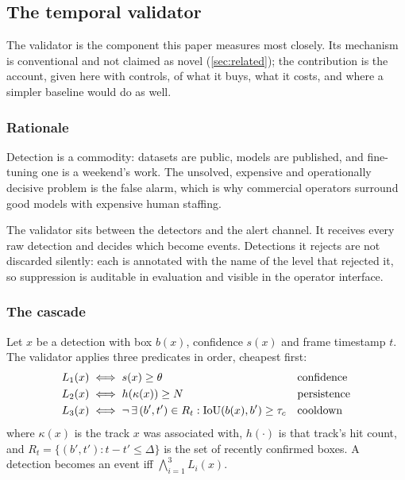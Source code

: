 \subsection{The temporal validator}
\label{sec:validator}

The validator is the component this paper measures most closely. Its
mechanism is conventional and not claimed as novel (\cref{sec:related}); the
contribution is the account, given here with controls, of what it buys, what
it costs, and where a simpler baseline would do as well.

\subsubsection{Rationale}

Detection is a commodity: datasets are public, models are published, and
fine-tuning one is a weekend's work. The unsolved, expensive and
operationally decisive problem is the false alarm, which is why commercial
operators surround good models with expensive human staffing.

The validator sits between the detectors and the alert channel. It receives
every raw detection and decides which become events. Detections it rejects are
not discarded silently: each is annotated with the name of the level that
rejected it, so suppression is auditable in evaluation and visible in the
operator interface.

\subsubsection{The cascade}

\begin{definition}[Cascade]
\label{def:cascade}
Let $x$ be a detection with box $b(x)$, confidence $s(x)$ and frame timestamp
$t$. The validator applies three predicates in order, cheapest first:
\begin{align}
  L_1(x) &\iff s(x) \ge \theta
    &&\text{confidence} \label{eq:l1}\\
  L_2(x) &\iff h(\kappa(x)) \ge N
    &&\text{persistence} \label{eq:l2}\\
  L_3(x) &\iff \neg\,\exists\,(b', t') \in R_t :
                \operatorname{IoU}(b(x), b') \ge \tau_c
    &&\text{cooldown} \label{eq:l3}
\end{align}
where $\kappa(x)$ is the track $x$ was associated with, $h(\cdot)$ is that
track's hit count, and $R_t = \{(b', t') : t - t' \le \Delta\}$ is the set of
recently confirmed boxes. A detection becomes an event iff
$\bigwedge_{i=1}^{3} L_i(x)$.
\end{definition}

